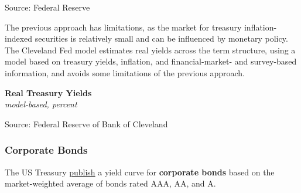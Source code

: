 \documentclass{report}
\makeatletter
\newcommand{\tbllink}[1]{\href{https://raw.githubusercontent.com/bdecon/US-chartbook/master/chartbook/data/#1}{\faTable}}
\newcommand*\short[1]{\expandafter\@gobbletwo\number\numexpr#1\relax}
\newcommand{\absnode}[3]{\node[below right, align=left] at (axis cs: #1,#2) {#3};}
\newcommand{\dateaxisticks}{
		date coordinates in=x, axis line style={draw=none},
		xmax={2024-01-31},
		max space between ticks=40,	    
		xtick={{1990-01-01}, {1992-01-01}, {1994-01-01}, 
			{1996-01-01}, {1998-01-01}, {2000-01-01}, 
			{2002-01-01}, {2004-01-01}, {2006-01-01},
			{2008-01-01}, {2010-01-01}, {2012-01-01}, {2014-01-01},
		    {2016-01-01}, {2018-01-01}, {2020-01-01}, {2022-01-01}, 
		    {2024-01-01}, {2026-01-01}},
		minor xtick={{1989-01-01}, {1991-01-01}, {1993-01-01},
			{1995-01-01}, {1997-01-01}, {1999-01-01}, 
			{2001-01-01}, {2003-01-01}, {2005-01-01}, {2007-01-01},
		    {2009-01-01}, {2011-01-01}, {2013-01-01}, {2015-01-01},
		    {2017-01-01}, {2019-01-01}, {2021-01-01}, {2023-01-01}, 
		    {2025-01-01}, {2027-01-01}},
		enlarge y limits={0.06}, enlarge x limits={0.01},
		xticklabel style={align=center, yshift=-2pt}, tick label style={inner sep=0pt},
		}
\newcommand{\bbar}[2]{extra #1 ticks = {{#2}}, extra #1 tick labels = ,
		extra #1 tick style = {grid=major, grid style={thick, black!25}},}
\newcommand{\stdline}[4]{\addplot[very thick, no markers, color=#1] 
		table [x=#2, y=#3, col sep=comma] {#4};	}
\newcommand{\rbars}{
		\fill[color=black!10] (axis cs:{1990-07-01},\pgfkeysvalueof{/pgfplots/ymin})
			rectangle (axis cs:{1991-03-01}, \pgfkeysvalueof{/pgfplots/ymax});
		\fill[color=black!10] (axis cs:{2007-12-01},\pgfkeysvalueof{/pgfplots/ymin})
			rectangle (axis cs:{2009-07-01}, \pgfkeysvalueof{/pgfplots/ymax});
		\fill[color=black!10] (axis cs:{2001-03-01},\pgfkeysvalueof{/pgfplots/ymin})
			rectangle (axis cs:{2001-11-01}, \pgfkeysvalueof{/pgfplots/ymax});
		\fill[color=black!10] (axis cs:{2020-02-01},\pgfkeysvalueof{/pgfplots/ymin})
			rectangle (axis cs:{2020-05-01}, \pgfkeysvalueof{/pgfplots/ymax});}
\makeatother
\begin{document}
{\begin{minipage}{1.0\textwidth}
\footnotesize{Source: Federal Reserve} \hfill \tbllink{real_rates.csv}
\vspace{3mm}

\small The previous approach has limitations, as the market for treasury inflation-indexed securities is relatively small and can be influenced by monetary policy. The Cleveland Fed model estimates real yields across the term structure, using a model based on treasury yields, inflation, and financial-market- and survey-based information, and avoids some limitations of the previous approach.


\vspace{1mm}

\normalsize \textbf{Real Treasury Yields}\\
\footnotesize{\textit{model-based, percent}}
\vspace{3.5cm}

\hspace{2mm} 
\vspace{1mm}

\footnotesize{Source: Federal Reserve of Bank of Cleveland}  \hfill \tbllink{real_rates2.csv}
\end{minipage}
\newpage
\begin{minipage}{1.0\textwidth}  
\subsubsection*{Corporate Bonds}  
\vspace{-0.5mm}

\small The US Treasury \href{https://home.treasury.gov/data/treasury-coupon-issues-and-corporate-bond-yield-curve/corporate-bond-yield-curve}{publish} a yield curve for \textbf{corporate bonds} based on the market-weighted average of bonds rated AAA, AA, and A. 
\vspace{0.5mm} 


\end{minipage}}
\end{document}
